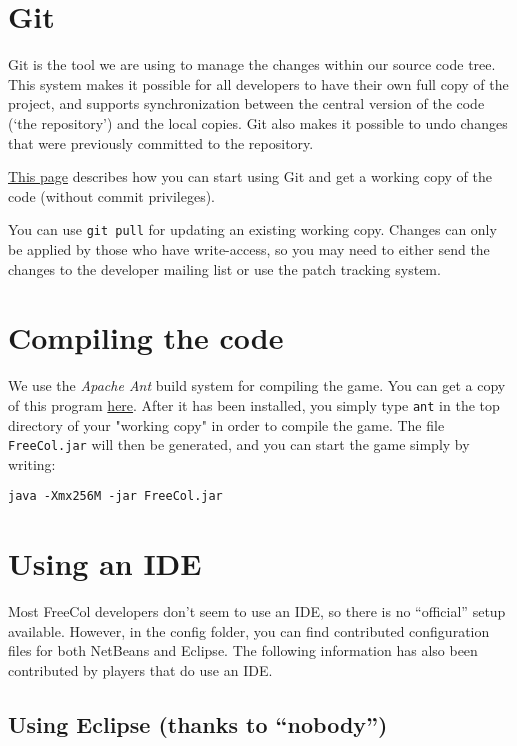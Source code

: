 \documentclass[12pt]{book}
\begin{document}
\hypertarget{Git}{\section{Git}}

Git is the tool we are using to manage the changes within our source
code tree.  This system makes it possible for all developers to have
their own full copy of the project, and supports synchronization
between the central version of the code (`the repository') and the
local copies.  Git also makes it possible to undo changes that were
previously committed to the repository.

\href{http://www.freecol.org/documentation/git.html}{This page}
describes how you can start using Git and get a working copy of the
code (without commit privileges).

You can use \verb+git pull+ for updating an existing working
copy.  Changes can only be applied by those who have write-access, so
you may need to either send the changes to the developer mailing list
or use the patch tracking system.


\hypertarget{Compiling the code}{\section{Compiling the code}}

We use the \textit{Apache Ant} build system for compiling the
game. You can get a copy of this program
\href{http://ant.apache.org}{here}. After it has been installed, you
simply type \verb+ant+ in the top directory of your "working copy" in
order to compile the game.  The file \verb+FreeCol.jar+ will then be
generated, and you can start the game simply by writing:

\verb+java -Xmx256M -jar FreeCol.jar+


\hypertarget{Using an IDE}{\section{Using an IDE}}

Most FreeCol developers don't seem to use an IDE, so there is no
``official'' setup available. However, in the config folder, you can
find contributed configuration files for both NetBeans and Eclipse.
The following information has also been contributed by players that do
use an IDE.

\hypertarget{Using Eclipse}{\subsection{Using Eclipse (thanks to ``nobody'')}}
\end{document}
